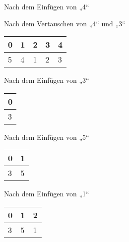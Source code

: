 \documentclass{bschlangaul-aufgabe}
\begin{document}
\begin{enumerate}
\begin{enumerate}
\begin{bAntwort}
\begin{bBaum}{Nach dem Einfügen von „4“}
\end{bBaum}

\begin{bBaum}{Nach dem Vertauschen von „4“ und „3“}
\begin{tabular}{lllll}
\bf{0} & \bf{1} & \bf{2} & \bf{3} & \bf{4} \\
\hline
5      & 4      & 1      & 2      & 3      \\
\end{tabular}

\end{bBaum}

%


\begin{bBaum}{Nach dem Einfügen von „3“}
\begin{tabular}{l}
\bf{0} \\
\hline
3      \\
\end{tabular}

\end{bBaum}

\begin{bBaum}{Nach dem Einfügen von „5“}
\begin{tabular}{ll}
\bf{0} & \bf{1} \\
\hline
3      & 5      \\
\end{tabular}

\end{bBaum}

\begin{bBaum}{Nach dem Einfügen von „1“}
\begin{tabular}{lll}
\bf{0} & \bf{1} & \bf{2} \\
\hline
3      & 5      & 1      \\
\end{tabular}


\end{bBaum}
\end{bAntwort}
\end{enumerate}
\end{enumerate}
\end{document}
